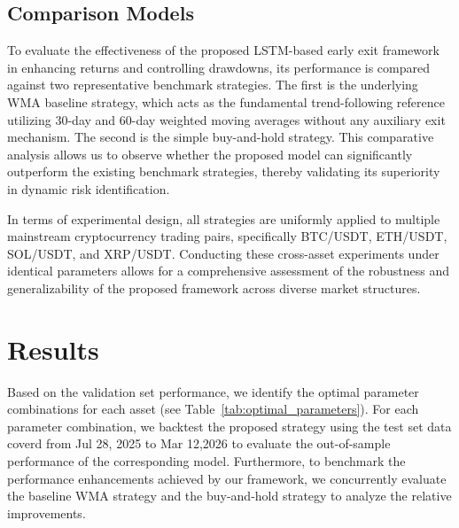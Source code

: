 \documentclass[12pt]{article}
\begin{document}
\subsection{Comparison Models}\label{subsec:comparison_models}

To evaluate the effectiveness of the proposed LSTM-based early exit framework in enhancing returns and controlling drawdowns, its performance is compared against two representative benchmark strategies. The first is the underlying WMA baseline strategy, which acts as the fundamental trend-following reference utilizing 30-day and 60-day weighted moving averages without any auxiliary exit mechanism. The second is the simple buy-and-hold strategy. This comparative analysis allows us to observe whether the proposed model can significantly outperform the existing benchmark strategies, thereby validating its superiority in dynamic risk identification.

In terms of experimental design, all strategies are uniformly applied to multiple mainstream cryptocurrency trading pairs, specifically BTC/USDT, ETH/USDT, SOL/USDT, and XRP/USDT. Conducting these cross-asset experiments under identical parameters allows for a comprehensive assessment of the robustness and generalizability of the proposed framework across diverse market structures.

\section{Results}\label{sec:results}

Based on the validation set performance, we identify the optimal parameter combinations for each asset (see Table~\ref{tab:optimal_parameters}). For each parameter combination, we backtest the proposed strategy using the test set data coverd from Jul 28, 2025 to Mar 12,2026 to evaluate the out-of-sample performance of the corresponding model. Furthermore, to benchmark the performance enhancements achieved by our framework, we concurrently evaluate the baseline WMA strategy and the buy-and-hold strategy to analyze the relative improvements.
\end{document}
